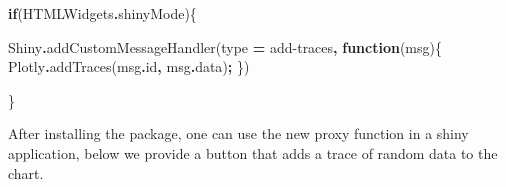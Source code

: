 \documentclass[
]{krantz}
\makeatletter
\newenvironment{Shaded}{\begin{snugshade}}{\end{snugshade}}
\newcommand{\AttributeTok}[1]{\textcolor[rgb]{0.61,0.61,0.61}{#1}}
\newcommand{\ControlFlowTok}[1]{\textcolor[rgb]{0.27,0.27,0.27}{\textbf{#1}}}
\newcommand{\FunctionTok}[1]{\textcolor[rgb]{0,0,0}{#1}}
\newcommand{\KeywordTok}[1]{\textcolor[rgb]{0.27,0.27,0.27}{\textbf{#1}}}
\newcommand{\NormalTok}[1]{#1}
\newcommand{\OperatorTok}[1]{\textcolor[rgb]{0.43,0.43,0.43}{\textbf{#1}}}
\newcommand{\StringTok}[1]{\textcolor[rgb]{0.5,0.5,0.5}{#1}}
\newenvironment{kframe}{%
\medskip{}
\setlength{\fboxsep}{.8em}
 \def\at@end@of@kframe{}%
 \ifinner\ifhmode%
  \def\at@end@of@kframe{\end{minipage}}%
  \begin{minipage}{\columnwidth}%
 \fi\fi%
 \def\FrameCommand##1{\hskip\@totalleftmargin \hskip-\fboxsep
 \colorbox{shadecolor}{##1}\hskip-\fboxsep
     \hskip-\linewidth \hskip-\@totalleftmargin \hskip\columnwidth}%
 \MakeFramed {\advance\hsize-\width
   \@totalleftmargin\z@ \linewidth\hsize
   \@setminipage}}%
 {\par\unskip\endMakeFramed%
 \at@end@of@kframe}
\renewenvironment{Shaded}{\begin{kframe}}{\end{kframe}}
\makeatother
\begin{document}
\begin{Shaded}
\begin{Highlighting}[]
\ControlFlowTok{if}\NormalTok{(HTMLWidgets}\OperatorTok{.}\AttributeTok{shinyMode}\NormalTok{)\{}

\NormalTok{  Shiny}\OperatorTok{.}\FunctionTok{addCustomMessageHandler}\NormalTok{(type }\OperatorTok{=} \StringTok{\textquotesingle{}add{-}traces\textquotesingle{}}\OperatorTok{,} \KeywordTok{function}\NormalTok{(msg)\{}
\NormalTok{    Plotly}\OperatorTok{.}\FunctionTok{addTraces}\NormalTok{(msg}\OperatorTok{.}\AttributeTok{id}\OperatorTok{,}\NormalTok{ msg}\OperatorTok{.}\AttributeTok{data}\NormalTok{)}\OperatorTok{;}
\NormalTok{  \})}

\NormalTok{\}}
\end{Highlighting}
\end{Shaded}

After installing the package, one can use the new proxy function in a shiny application, below we provide a button that adds a trace of random data to the chart.
\end{document}
